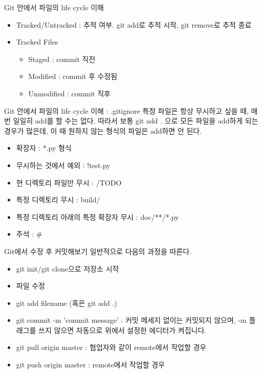 \documentclass{beamer}
\begin{document}
\begin{frame}{Git 안에서 파일의 life cycle 이해}
\begin{itemize} 
\item Tracked/Untracked : 추적 여부. git add로 추적 시작, git remove로 추적 종료
\item Tracked Files
\begin{itemize} 
\item Staged : commit 직전
\item Modified : commit 후 수정됨
\item Unmodified : commit 직후
\end{itemize}
\end{itemize}
\end{frame}


\begin{frame}{Git 안에서 파일의 life cycle 이해 : .gitignore}
특정 파일은 항상 무시하고 싶을 때, 매번 일일히 add를 할 수는 없다. 따라서 보통 git add . 으로 모든 파일을 add하게 되는 경우가 많은데, 이 때 원하지 않는 형식의 파일은 add하면 안 된다. 
\begin{itemize} 
\item 확장자 : *.py 형식 
\item 무시하는 것에서 예외 : !test.py 
\item 현 디렉토리 파일만 무시 : /TODO
\item 특정 디렉토리 무시 : build/
\item 특정 디렉토리 아래의 특정 확장자 무시 : doc/**/*.py
\item 주석 : \# 
\end{itemize}
\end{frame}


\begin{frame}{Git에서 수정 후 커밋해보기}
일반적으로 다음의 과정을 따른다. 
\begin{itemize} 
\item git init/git clone으로 저장소 시작 
\item 파일 수정 
\item git add filename (혹은 git add .) 
\item git commit -m 'commit message' : 커밋 메세지 없이는 커밋되지 않으며, -m 플래그를 쓰지 않으면 자동으로 위에서 설정한 에디터가 켜집니다. 
\item git pull origin master : 협업자와 같이 remote에서 작업할 경우 
\item git push origin master : remote에서 작업할 경우
\end{itemize}
\end{frame}
\end{document}
